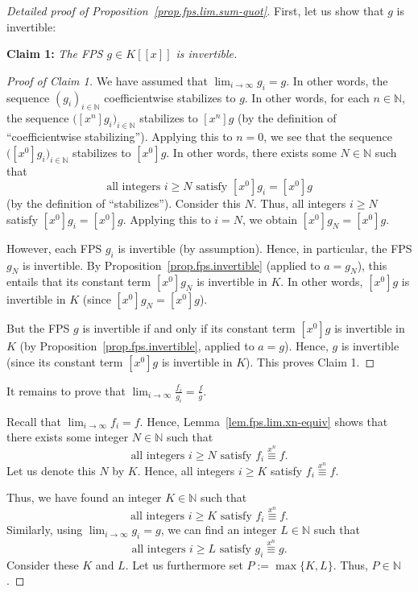 \begin{proof}[Detailed proof of Proposition~\ref{prop.fps.lim.sum-quot}]
\leanok
First, let us show that $g$ is invertible:

\textbf{Claim 1:} \textit{The FPS $g\in K[[x]]$ is invertible.}

\begin{proof}[Proof of Claim 1]
\leanok
We have assumed that $\lim_{i\to\infty} g_i = g$. In other words, the
sequence $(g_i)_{i\in\mathbb{N}}$ coefficientwise stabilizes to $g$.
In other words, for each $n\in\mathbb{N}$, the sequence
$\bigl([x^n] g_i\bigr)_{i\in\mathbb{N}}$ stabilizes to $[x^n] g$
(by the definition of ``coefficientwise stabilizing''). Applying this to
$n = 0$, we see that the sequence $\bigl([x^0] g_i\bigr)_{i\in\mathbb{N}}$
stabilizes to $[x^0] g$. In other words, there exists some
$N\in\mathbb{N}$ such that
\[
\text{all integers } i\geq N \text{ satisfy }
[x^0] g_i = [x^0] g
\]
(by the definition of ``stabilizes''). Consider this $N$. Thus, all
integers $i\geq N$ satisfy $[x^0] g_i = [x^0] g$. Applying this to
$i = N$, we obtain $[x^0] g_N = [x^0] g$.

However, each FPS $g_i$ is invertible (by assumption). Hence, in
particular, the FPS $g_N$ is invertible. By
Proposition~\ref{prop.fps.invertible} (applied to $a = g_N$), this
entails that its constant term $[x^0] g_N$ is invertible in $K$. In
other words, $[x^0] g$ is invertible in $K$ (since
$[x^0] g_N = [x^0] g$).

But the FPS $g$ is invertible if and only if its constant term $[x^0] g$
is invertible in $K$ (by Proposition~\ref{prop.fps.invertible}, applied
to $a = g$). Hence, $g$ is invertible (since its constant term $[x^0] g$
is invertible in $K$). This proves Claim 1.
\end{proof}

It remains to prove that
$\lim_{i\to\infty} \frac{f_i}{g_i} = \frac{f}{g}$.

Recall that $\lim_{i\to\infty} f_i = f$. Hence,
Lemma~\ref{lem.fps.lim.xn-equiv} shows that there exists some integer
$N\in\mathbb{N}$ such that
\[
\text{all integers } i\geq N \text{ satisfy }
f_i \overset{x^n}{\equiv} f.
\]
Let us denote this $N$ by $K$. Hence, all integers $i\geq K$ satisfy
$f_i \overset{x^n}{\equiv} f$.

Thus, we have found an integer $K\in\mathbb{N}$ such that
\[
\text{all integers } i\geq K \text{ satisfy }
f_i \overset{x^n}{\equiv} f.
\]
Similarly, using $\lim_{i\to\infty} g_i = g$, we can find an integer
$L\in\mathbb{N}$ such that
\[
\text{all integers } i\geq L \text{ satisfy }
g_i \overset{x^n}{\equiv} g.
\]
Consider these $K$ and $L$. Let us furthermore set
$P := \max\{K, L\}$. Thus, $P\in\mathbb{N}$.


\end{proof}
